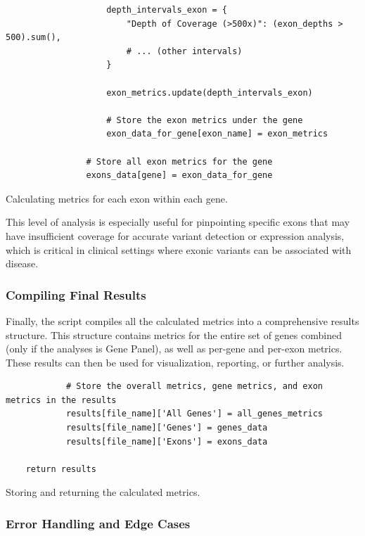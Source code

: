 \begin{longlisting}
\begin{verbatim}
                    depth_intervals_exon = {
                        "Depth of Coverage (>500x)": (exon_depths > 500).sum(),
                        # ... (other intervals)
                    }

                    exon_metrics.update(depth_intervals_exon)

                    # Store the exon metrics under the gene
                    exon_data_for_gene[exon_name] = exon_metrics

                # Store all exon metrics for the gene
                exons_data[gene] = exon_data_for_gene
\end{verbatim}
\caption{Calculating metrics for each exon within each gene.}
\label{lbl:metrics_exon}
\end{longlisting}

This level of analysis is especially useful for pinpointing specific exons that may have insufficient coverage for accurate variant detection or expression analysis, which is critical in clinical settings where exonic variants can be associated with disease.

\subsubsection{\textbf{Compiling Final Results}}

Finally, the script compiles all the calculated metrics into a comprehensive results structure. This structure contains metrics for the entire set of genes combined (only if the analyses is Gene Panel), as well as per-gene and per-exon metrics. These results can then be used for visualization, reporting, or further analysis.

\begin{longlisting}
\begin{verbatim}
            # Store the overall metrics, gene metrics, and exon metrics in the results
            results[file_name]['All Genes'] = all_genes_metrics
            results[file_name]['Genes'] = genes_data
            results[file_name]['Exons'] = exons_data

    return results
\end{verbatim}
\caption{Storing and returning the calculated metrics.}
\label{lbl:metrics_results}
\end{longlisting}

\subsubsection{\textbf{Error Handling and Edge Cases}}

